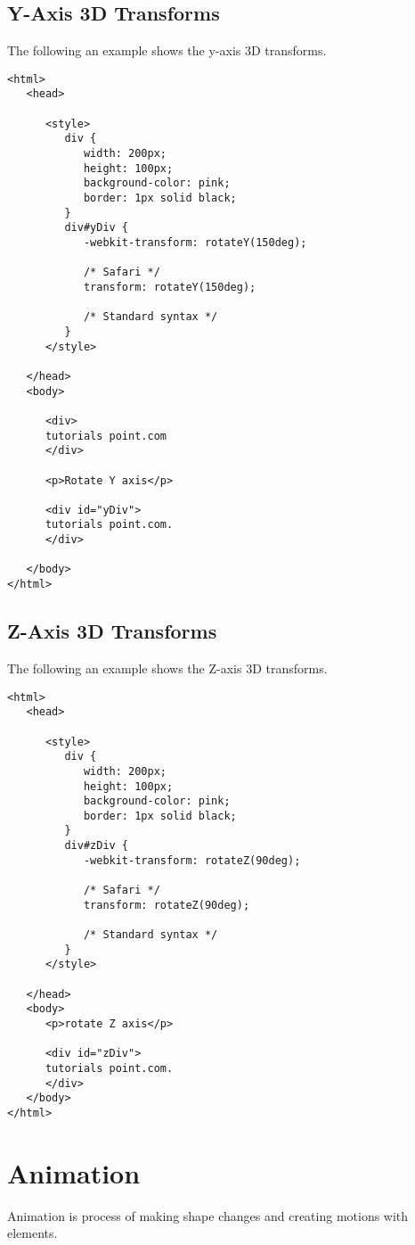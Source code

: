 \documentclass[a4paper,oneside]{book}
\numberwithin{equation}{chapter}
\begin{document}
\subsection{Y-Axis 3D Transforms}
The following an example shows the y-axis 3D transforms.
\begin{verbatim}
<html>
   <head>
   
      <style>
         div {
            width: 200px;
            height: 100px;
            background-color: pink;
            border: 1px solid black;
         }
         div#yDiv {
            -webkit-transform: rotateY(150deg); 
            
            /* Safari */
            transform: rotateY(150deg); 
            
            /* Standard syntax */
         }
      </style>
      
   </head>
   <body>
   
      <div>
      tutorials point.com
      </div>
      
      <p>Rotate Y axis</p>
      
      <div id="yDiv">
      tutorials point.com.
      </div>
      
   </body>
</html>
\end{verbatim}
\subsection{Z-Axis 3D Transforms}
The following an example shows the Z-axis 3D transforms.
\begin{verbatim}
<html>
   <head>
   
      <style>
         div {
            width: 200px;
            height: 100px;
            background-color: pink;
            border: 1px solid black;
         }
         div#zDiv {
            -webkit-transform: rotateZ(90deg); 
            
            /* Safari */
            transform: rotateZ(90deg); 
            
            /* Standard syntax */
         }
      </style>
      
   </head>
   <body>
      <p>rotate Z axis</p>
      
      <div id="zDiv">
      tutorials point.com.
      </div>
   </body>
</html> 
\end{verbatim}
\section{Animation}
Animation is process of making shape changes and creating motions with elements.
\end{document}
